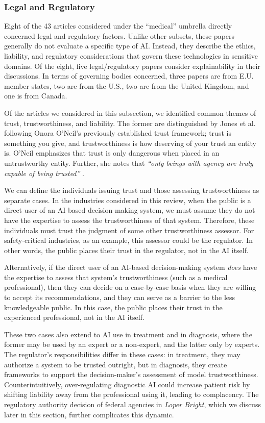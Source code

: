 \documentclass[preprint,12pt]{elsarticle}
\begin{document}
\subsubsection{Legal and Regulatory}
\label{sec:regulatory}
Eight of the 43 articles considered under the ``medical'' umbrella directly
concerned legal and regulatory factors. Unlike other subsets, these papers
generally do not evaluate a specific type of AI. Instead, they describe the
ethics, liability, and regulatory considerations that govern these technologies
in sensitive domains. Of the eight, five legal/regulatory papers consider
explainability in their discussions. In terms of governing bodies concerned,
three papers are from E.U. member states, two are from the U.S., two are from
the United Kingdom, and one is from Canada. 

Of the articles we considered in this subsection, we identified common themes of
trust, trustworthiness, and liability. The former are distinguished by Jones et
al. \cite{jonesArtificialIntelligenceClinical2023} following Onora O'Neil's
previously established trust framework; trust is something you give, and
trustworthiness is how deserving of your trust an entity is. O'Neil emphasizes
that trust is only dangerous when placed in an untrustworthy entity. Further,
she notes that \textit{``only beings with agency are truly capable of being
trusted''} \cite{jonesArtificialIntelligenceClinical2023}. 

We can define the individuals issuing trust and those assessing trustworthiness
as separate cases. In the industries considered in this review, when the public
is a direct user of an AI-based decision-making system, we must assume they do
not have the expertise to assess the trustworthiness of that system. Therefore,
these individuals must trust the judgment of some other trustworthiness
assessor. For safety-critical industries, as an example, this assessor could be
the regulator. In other words, the public places their trust in the regulator,
not in the AI itself. 

Alternatively, if the direct user of an AI-based decision-making system
\textit{does} have the expertise to assess that system's trustworthiness (such
as a medical professional), then they can decide on a case-by-case basis when
they are willing to accept its recommendations, and they can serve as a barrier
to the less knowledgeable public. In this case, the public places their trust in
the experienced professional, not in the AI itself.

These two cases also extend to AI use in treatment and in diagnosis, where the
former may be used by an expert or a non-expert, and the latter only by experts.
The regulator's responsibilities differ in these cases: in treatment, they may
authorize a system to be trusted outright, but in diagnosis, they create
frameworks to support the decision-maker's assessment of model trustworthiness.
Counterintuitively, over-regulating diagnostic AI could increase patient risk by
shifting liability away from the professional using it, leading to complacency.
The regulatory authority decision of federal agencies in \textit{Loper Bright},
which we discuss later in this section, further complicates this dynamic.
\end{document}
